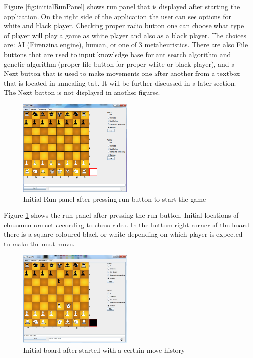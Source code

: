 \documentclass[pdftex]{article}
\begin{document}
Figure \ref{fig:initialRunPanel} shows run panel that is displayed after starting the application. On the right side of the application the user can see options for white and black player. Checking proper radio button one can choose what type of player will play a game as white player and also as a black player. The choices are: AI (Firenzina engine), human, or one of 3 metaheuristics. There are also File buttons that are used to input knowledge base for ant search algorithm and genetic algorithm (proper file button for proper white or black player), and a Next button that is used to make movements one after another from a textbox that is located in annealing tab. It will be further discussed in a later section. The Next button is not displayed in another figures.

\begin{figure}[!htb]
	\centering
	\includegraphics[width=0.5\textwidth]{chessImages/InitialAfterRun.png} 
	\caption{Initial Run panel after pressing run button to start the game}
	\label{fig:initialRunPanelAfterRun}
\end{figure}

Figure \ref{fig:initialRunPanelAfterRun} shows the run panel after pressing the run button. Initial locations of chessmen are set according to chess rules. In the bottom right corner of the board there is a square coloured black or white depending on which player is expected to make the next move.

\begin{figure}[!htb]
	\centering
	\includegraphics[width=0.5\textwidth]{chessImages/withHistory.png} 
	\caption{Initial board after started with a certain move history}
	\label{fig:runPanelWithHistory}
\end{figure}
\end{document}

